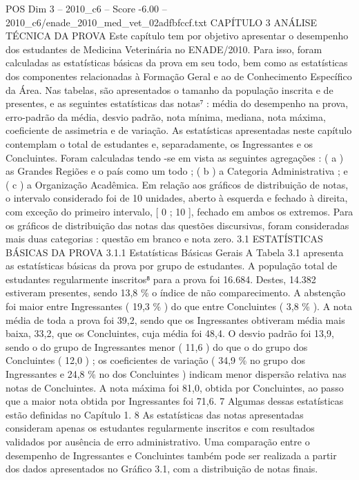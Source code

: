 \begin{textsample}{POS Dim 3 – 2010\_c6 – Score -6.00 – 2010\_c6/enade\_2010\_med\_vet\_02adfbfccf.txt}  \label{ex:f3_pos_267}
CAPÍTULO 3 ANÁLISE TÉCNICA DA PROVA Este capítulo tem por objetivo apresentar o desempenho dos estudantes de Medicina Veterinária no ENADE/2010.
Para isso, foram calculadas as estatísticas básicas da prova em seu todo, bem como as estatísticas dos componentes relacionadas à Formação Geral e ao de Conhecimento Específico da Área.
Nas tabelas, são apresentados o tamanho da população inscrita e de presentes, e as seguintes estatísticas das notas⁷ : média do desempenho na prova, erro-padrão da média, desvio padrão, nota mínima, mediana, nota máxima, coeficiente de assimetria e de variação.
As estatísticas apresentadas neste capítulo contemplam o total de estudantes e, separadamente, os Ingressantes e os Concluintes.
Foram calculadas tendo -se em vista as seguintes agregações : ( a ) as Grandes Regiões e o país como um todo ; ( b ) a Categoria Administrativa ; e ( c ) a Organização Acadêmica.
Em relação aos gráficos de distribuição de notas, o intervalo considerado foi de 10 unidades, aberto à esquerda e fechado à direita, com exceção do primeiro intervalo, [ 0 ; 10 ], fechado em ambos os extremos.
Para os gráficos de distribuição das notas das questões discursivas, foram consideradas mais duas categorias : questão em branco e nota zero. 3.1 ESTATÍSTICAS BÁSICAS DA PROVA 3.1.1 Estatísticas Básicas Gerais A Tabela 3.1 apresenta as estatísticas básicas da prova por grupo de estudantes.
A população total de estudantes regularmente inscritos⁸ para a prova foi 16.684.
Destes, 14.382 estiveram presentes, sendo 13,8 \% o índice de não comparecimento.
A abstenção foi maior entre Ingressantes ( 19,3 \% ) do que entre Concluintes ( 3,8 \% ).
A nota média de toda a prova foi 39,2, sendo que os Ingressantes obtiveram média mais baixa, 33,2, que os Concluintes, cuja média foi 48,4.
O desvio padrão foi 13,9, sendo o do grupo de Ingressantes menor ( 11,6 ) do que o do grupo dos Concluintes ( 12,0 ) ; os coeficientes de variação ( 34,9 \% no grupo dos Ingressantes e 24,8 \% no dos Concluintes ) indicam menor dispersão relativa nas notas de Concluintes.
A nota máxima foi 81,0, obtida por Concluintes, ao passo que a maior nota obtida por Ingressantes foi 71,6. 7 Algumas dessas estatísticas estão definidas no Capítulo 1. 8 As estatísticas das notas apresentadas consideram apenas os estudantes regularmente inscritos e com resultados validados por ausência de erro administrativo.
Uma comparação entre o desempenho de Ingressantes e Concluintes também pode ser realizada a partir dos dados apresentados no Gráfico 3.1, com a distribuição de notas finais.

\end{textsample}
